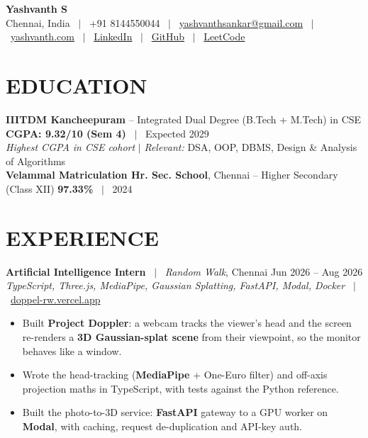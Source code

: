 \documentclass[a4paper,10pt]{article}
\begin{document}
\fontsize{9.0}{10.8}\selectfont

\begin{center}
    {\Large \textbf{Yashvanth S}} \\[2pt]
    \small
    Chennai, India \ $|$ \ +91 8144550044 \ $|$ \
    \href{mailto:yashvanthsankar@gmail.com}{yashvanthsankar@gmail.com} \ $|$ \
    \href{https://yashvanth.com}{yashvanth.com} \ $|$ \
    \href{https://linkedin.com/in/yashvanths/}{LinkedIn} \ $|$ \
    \href{https://github.com/YashvanthSankar/}{GitHub} \ $|$ \
    \href{https://leetcode.com/u/yashvanths/}{LeetCode}
\end{center}

\vspace{-1.3em}

\section*{EDUCATION}
\textbf{IIITDM Kancheepuram} -- Integrated Dual Degree (B.Tech + M.Tech) in CSE \hfill \textbf{CGPA: 9.32/10 (Sem 4)} \ $|$ \ Expected 2029 \\
\textit{Highest CGPA in CSE cohort} $|$ \textit{Relevant:} DSA, OOP, DBMS, Design \& Analysis of Algorithms \\[2pt]
\textbf{Velammal Matriculation Hr. Sec. School}, Chennai -- Higher Secondary (Class XII) \hfill \textbf{97.33\%} \ $|$ \ 2024

\section*{EXPERIENCE}
\textbf{Artificial Intelligence Intern} \ $|$ \ \textit{Random Walk}, Chennai \hfill Jun 2026 -- Aug 2026 \\[-2pt]
{\small \textit{TypeScript, Three.js, MediaPipe, Gaussian Splatting, FastAPI, Modal, Docker} \ $|$ \ \href{https://doppel-rw.vercel.app}{doppel-rw.vercel.app}}
\begin{itemize}
    \item Built \textbf{Project Doppler}: a webcam tracks the viewer's head and the screen re-renders a \textbf{3D Gaussian-splat scene} from their viewpoint, so the monitor behaves like a window.
    \item Wrote the head-tracking (\textbf{MediaPipe} + One-Euro filter) and off-axis projection maths in TypeScript, with tests against the Python reference.
    \item Built the photo-to-3D service: \textbf{FastAPI} gateway to a GPU worker on \textbf{Modal}, with caching, request de-duplication and API-key auth.
\end{itemize}
\end{document}
